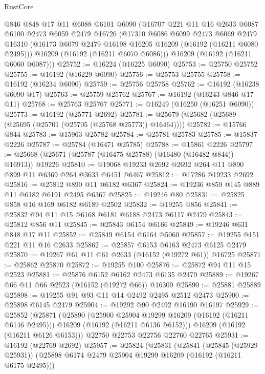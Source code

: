 \begin{lexlean}{RustCore}
\begin{coremodule}
    @846
    @848
    @17
    @11
    @6088
    @6101
    @6090
    (@16707
      @221
      @11
      @16
      @2633
      @6087
      @6100
      @2473
      @6059
      @2479
      @16726
      (@17310
        @6086
        @6099
        @2473
        @6069
        @2479
        @16310
        (@16173 @6079 @2479 @16198 @16205 @16209 (@16192 (@16211 @6080 @2495)))
        @16209
        (@16192 (@16211 @6070 @6086)))
      @16209
      (@16192 (@16211 @6060 @6087)))
@25752 := @16224 (@16225 @6090)
@25753 := @25750 @25752
@25755 := @16192 (@16229 @6090)
@25756 := @25753 @25755
@25758 := @16192 (@16234 @6090)
@25759 := @25756 @25758
@25762 := @16192 (@16238 @6090 @17)
@25763 := @25759 @25762
@25767 := @16192 (@16243 @846 @17 @11)
@25768 := @25763 @25767
@25771 := @16249 (@16250 (@16251 @6090))
@25773 := @16192 (@25771 @2692)
@25781 := @25679 (@25682 (@25689 (@25695 (@25701 (@25705 (@25768 @25773)) @16464))))
@25782 := @15766 @844
@25783 := @15963 @25782
@25784 := @25781 @25783
@25785 := @15837 @2226
@25787 := @25784 (@16471 @25785)
@25788 := @15861 @2226
@25797 := @25668 (@25671 (@25787 (@16475 @25788) (@16480 (@16482 @844)) @16913)) @19226
@25810 := @19068 @19233 @2692 @2692 @264 @11 @890 @899 @11 @6369 @264 @3633 @6451 @6467
@25812 := @17286 @19233 @2692
@25816 := @25812 @890 @11 @6182 @6367
@25824 := @19236 @859 @145 @889 @11 @6182 @6191 @2495 @6367
@25825 := @19246 @80
@25831 := @25825 @858 @16 @169 @6182 @6189 @2502
@25832 := @19255 @856
@25841 := @25832 @94 @11 @15 @6168 @6181 @6188 @2473 @6117 @2479
@25843 := @25812 @856 @11
@25845 := @25843 @6154 @6166
@25849 := @19246 @631 @848 @17 @11
@25852 := @25849 @6154 @6164 @5060
@25857 := @19255 @151 @221 @11 @16 @2633
@25862 := @25857 @6153 @6163 @2473 @6125 @2479
@25870 := @19267 @61 @11 @61 @2633 (@16152 (@19272 @61)) @16725
@25871 := @25862 @25870
@25872 := @19255 @100
@25876 := @25872 @94 @11 @15 @2523
@25881 := @25876 @6152 @6162 @2473 @6135 @2479
@25889 := @19267 @66 @11 @66 @2523 (@16152 (@19272 @66)) @16309
@25890 := @25881 @25889
@25898 := @19255 @91 @93 @11 @14 @2492 @2495 @2512 @2473
@25900 := @25898 @6145 @2479
@25904 := @19292 @90 @2492 @16190 @16197
@25929 := @25852
    (@25871
      (@25890
        (@25900 @25904 @19299 @16209 (@16192 (@16211 @6146 @2495)))
        @16209
        (@16192 (@16211 @6136 @6152)))
      @16209
      (@16192 (@16211 @6126 @6153)))
    @22750
    @22753
    @22756
    @22760
    @22765
@25931 := @16192 (@22769 @2692)
@25957 := @25824
    (@25831
      (@25841
        (@25845 (@25929 @25931))
        (@25898 @6174 @2479 @25904 @19299 @16209 (@16192 (@16211 @6175 @2495)))

\end{coremodule}
\end{lexlean}
